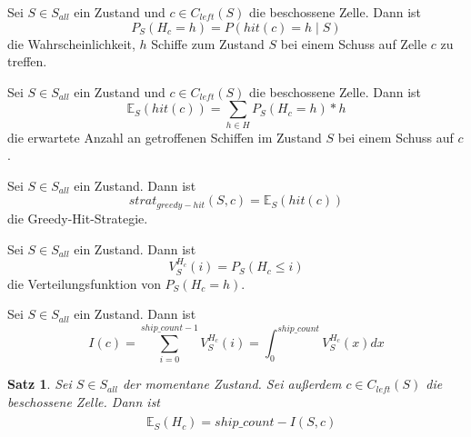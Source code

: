 \documentclass[a4paper,12pt]{llncs}
\numberwithin{equation}{section}
\newtheorem{satz}{Satz}
\begin{document}
\begin{definition}
Sei $S\in S_{all}$ ein Zustand und $c \in C_{left}(S)$ die beschossene Zelle.
Dann ist
\[
P_S(H_{c}=h)=P(hit(c)=h \mid S) 
\]
die Wahrscheinlichkeit, $h$ Schiffe zum Zustand $S$ bei einem Schuss auf Zelle $c$ zu treffen.
\end{definition}

\begin{definition}
Sei $S\in S_{all}$ ein Zustand und $c \in C_{left}(S)$ die beschossene Zelle.
Dann ist
\[
\mathds{E}_S(hit(c))=\sum_{h \in H} P_S(H_{c}=h) * h
\]
die erwartete Anzahl an getroffenen Schiffen im Zustand $S$ bei einem Schuss auf $c$.
\end{definition}

\begin{definition}
Sei $S\in S_{all}$ ein Zustand.
Dann ist
\[
strat_{greedy-hit}(S,c)=\mathds{E}_S(hit(c))
\]
die Greedy-Hit-Strategie.
\end{definition}

\begin{definition}
Sei $S\in S_{all}$ ein Zustand.
Dann ist
\[
V_S^{H_{c}}(i)=P_S(H_{c} \leq i)
\]
die Verteilungsfunktion von $P_S(H_{c}=h)$.
\end{definition}

\begin{definition}
Sei $S\in S_{all}$ ein Zustand.
Dann ist
\[
I(c)=\sum_{i=0}^{ship\_count - 1} V_S^{H_{c}}(i)=\int_{0}^{ship\_count} V_S^{H_{c}}(x) dx
\]
\end{definition}

\begin{satz}
Sei $S\in S_{all}$ der momentane Zustand.
Sei außerdem $c \in C_{left}(S)$ die beschossene Zelle.
Dann ist
\begin{align}
\begin{split}
&\mathds{E}_S(H_c)=ship\_count - I(S,c)
\end{split}
\end{align}
\end{satz}
\end{document}
